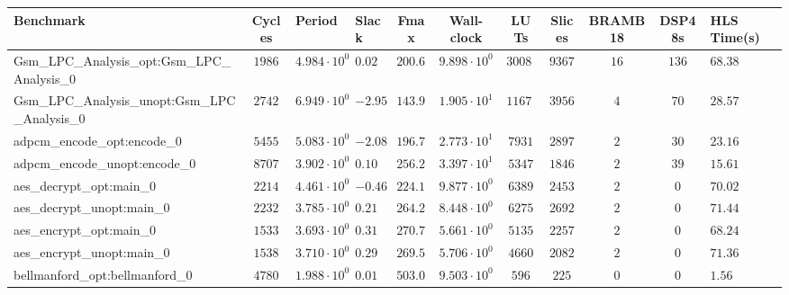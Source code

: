 \begin{tabular}{|l|c|HHc|c|c|c|c|cH|}
\hline
Benchmark                                       & Cycles       & Period                 & Slack     & Fmax       & Wall-clock              & LUTs       & Slices    & BRAMB18 & DSP48s  & HLS Time(s) \\
\hline
Gsm\_LPC\_Analysis\_opt:Gsm\_LPC\_Analysis\_0   & $ 1986     $ & $ 4.984 \cdot 10^{0} $ & $ 0.02  $ & $ 200.64 $ & $ 9.898 \cdot 10^{0}  $ & $ 30087  $ & $ 9367  $ & $ 16  $ & $ 136 $ & $ 68.38   $ \\
Gsm\_LPC\_Analysis\_unopt:Gsm\_LPC\_Analysis\_0 & $ 2742     $ & $ 6.949 \cdot 10^{0} $ & $ -2.95 $ & $ 143.91 $ & $ 1.905 \cdot 10^{1}  $ & $ 11673  $ & $ 3956  $ & $ 4   $ & $ 70  $ & $ 28.57   $ \\
adpcm\_encode\_opt:encode\_0                    & $ 5455     $ & $ 5.083 \cdot 10^{0} $ & $ -2.08 $ & $ 196.73 $ & $ 2.773 \cdot 10^{1}  $ & $ 7931   $ & $ 2897  $ & $ 2   $ & $ 30  $ & $ 23.16   $ \\
adpcm\_encode\_unopt:encode\_0                  & $ 8707     $ & $ 3.902 \cdot 10^{0} $ & $ 0.10  $ & $ 256.28 $ & $ 3.397 \cdot 10^{1}  $ & $ 5347   $ & $ 1846  $ & $ 2   $ & $ 39  $ & $ 15.61   $ \\
aes\_decrypt\_opt:main\_0                       & $ 2214     $ & $ 4.461 \cdot 10^{0} $ & $ -0.46 $ & $ 224.16 $ & $ 9.877 \cdot 10^{0}  $ & $ 6389   $ & $ 2453  $ & $ 2   $ & $ 0   $ & $ 70.02   $ \\
aes\_decrypt\_unopt:main\_0                     & $ 2232     $ & $ 3.785 \cdot 10^{0} $ & $ 0.21  $ & $ 264.20 $ & $ 8.448 \cdot 10^{0}  $ & $ 6275   $ & $ 2692  $ & $ 2   $ & $ 0   $ & $ 71.44   $ \\
aes\_encrypt\_opt:main\_0                       & $ 1533     $ & $ 3.693 \cdot 10^{0} $ & $ 0.31  $ & $ 270.78 $ & $ 5.661 \cdot 10^{0}  $ & $ 5135   $ & $ 2257  $ & $ 2   $ & $ 0   $ & $ 68.24   $ \\
aes\_encrypt\_unopt:main\_0                     & $ 1538     $ & $ 3.710 \cdot 10^{0} $ & $ 0.29  $ & $ 269.54 $ & $ 5.706 \cdot 10^{0}  $ & $ 4660   $ & $ 2082  $ & $ 2   $ & $ 0   $ & $ 71.36   $ \\
bellmanford\_opt:bellmanford\_0                 & $ 4780     $ & $ 1.988 \cdot 10^{0} $ & $ 0.01  $ & $ 503.02 $ & $ 9.503 \cdot 10^{0}  $ & $ 596    $ & $ 225   $ & $ 0   $ & $ 0   $ & $ 1.56    $ \\

\end{tabular}
